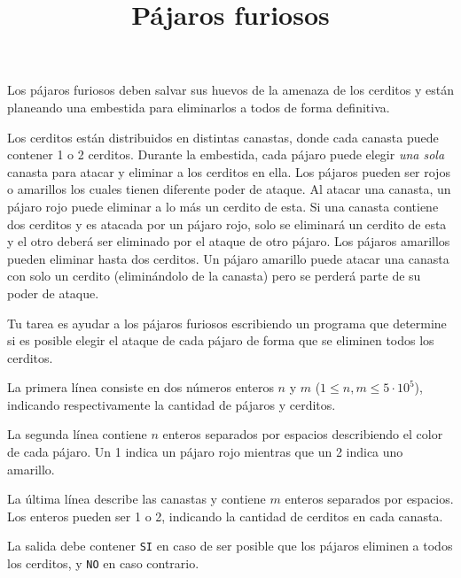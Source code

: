\documentclass{oci}
\title{Pájaros furiosos}
\begin{document}
\begin{problemDescription}
Los pájaros furiosos deben salvar sus huevos de la amenaza de los
cerditos y están planeando una embestida
para eliminarlos a todos de forma definitiva.

Los cerditos están distribuidos en distintas canastas, donde cada
canasta puede contener 1 o 2 cerditos.
Durante la embestida, cada pájaro puede elegir \emph{una sola} canasta para
atacar y eliminar a los cerditos en ella.
Los pájaros pueden ser rojos o amarillos los cuales tienen
diferente poder de ataque.
Al atacar una canasta, un pájaro rojo puede eliminar a lo más un
cerdito de esta.
Si una canasta contiene dos cerditos y es atacada por un pájaro rojo,
solo se eliminará un cerdito de esta y el otro deberá ser eliminado por
el ataque de otro pájaro.
Los pájaros amarillos pueden eliminar hasta dos cerditos.
Un pájaro amarillo puede atacar una canasta con solo un cerdito
(eliminándolo de la canasta) pero se perderá parte de su poder
de ataque.

Tu tarea es ayudar a los pájaros furiosos escribiendo un programa
que determine si es posible elegir el ataque de cada pájaro de forma
que se eliminen todos los cerditos.
\end{problemDescription}

\begin{inputDescription}
	La primera línea consiste en dos números enteros $n$ y $m$ ($1 \leq n, m \leq 5 \cdot 10^5$),
	indicando respectivamente la cantidad de pájaros y cerditos.

	La segunda línea contiene $n$ enteros separados por espacios describiendo
	el color de cada pájaro.
	Un 1 indica un pájaro rojo mientras que un 2 indica uno amarillo.

	La última línea describe las canastas y contiene $m$ enteros separados por espacios.
	Los enteros pueden ser 1 o 2, indicando la cantidad de cerditos en cada canasta.
\end{inputDescription}

\begin{outputDescription}
	La salida debe contener \texttt{SI} en caso de ser posible que los pájaros
	eliminen a todos los cerditos, y \texttt{NO} en caso contrario.
\end{outputDescription}

\begin{sampleDescription}
\end{sampleDescription}
\end{document}

